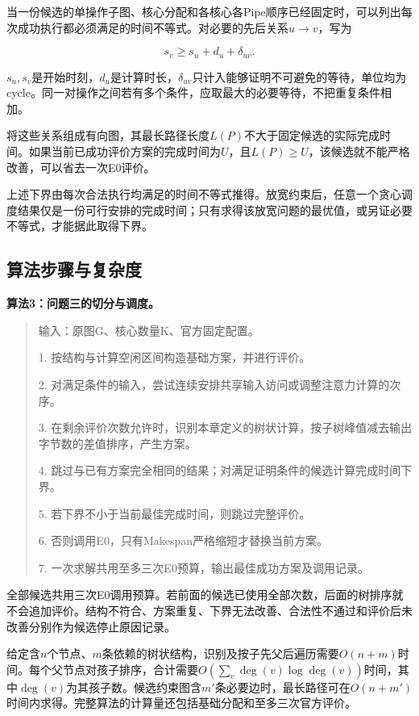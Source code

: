 \documentclass[anonymous,notoc]{gmcm2026}
\begin{document}
当一份候选的单操作子图、核心分配和各核心各Pipe顺序已经固定时，可以列出每次成功执行都必须满足的时间不等式。对必要的先后关系\(u\to v\)，写为

\[s_v\ge s_u+d_u+\delta_{uv}.\]

\(s_u,s_v\)是开始时刻，\(d_u\)是计算时长，\(\delta_{uv}\)只计入能够证明不可避免的等待，单位均为cycle。同一对操作之间若有多个条件，应取最大的必要等待，不把重复条件相加。

将这些关系组成有向图，其最长路径长度\(L(P)\)不大于固定候选的实际完成时间。如果当前已成功评价方案的完成时间为\(U\)，且\(L(P)\ge U\)，该候选就不能严格改善，可以省去一次E0评价。

上述下界由每次合法执行均满足的时间不等式推得。放宽约束后，任意一个贪心调度结果仅是一份可行安排的完成时间；只有求得该放宽问题的最优值，或另证必要不等式，才能据此取得下界。

\subsection{算法步骤与复杂度}

\textbf{算法3：问题三的切分与调度。}

\begin{quote}
输入：原图G、核心数量K、官方固定配置。

1. 按结构与计算空闲区间构造基础方案，并进行评价。

2. 对满足条件的输入，尝试连续安排共享输入访问或调整注意力计算的次序。

3. 在剩余评价次数允许时，识别本章定义的树状计算，按子树峰值减去输出字节数的差值排序，产生方案。

4. 跳过与已有方案完全相同的结果；对满足证明条件的候选计算完成时间下界。

5. 若下界不小于当前最佳完成时间，则跳过完整评价。

6. 否则调用E0，只有Makespan严格缩短才替换当前方案。

7. 一次求解共用至多三次E0预算，输出最佳成功方案及调用记录。
\end{quote}

全部候选共用三次E0调用预算。若前面的候选已使用全部次数，后面的树排序就不会追加评价。结构不符合、方案重复、下界无法改善、合法性不通过和评价后未改善分别作为候选停止原因记录。

给定含\(n\)个节点、\(m\)条依赖的树状结构，识别及按子先父后遍历需要\(O(n+m)\)时间。每个父节点对孩子排序，合计需要\(O(\sum_v\deg(v)\log\deg(v))\)时间，其中\(\deg(v)\)为其孩子数。候选约束图含\(m'\)条必要边时，最长路径可在\(O(n+m')\)时间内求得。完整算法的计算量还包括基础分配和至多三次官方评价。
\end{document}
